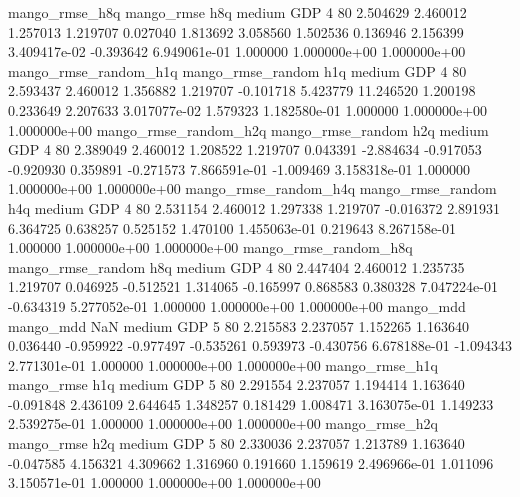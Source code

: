       mango_rmse_h8q        mango_rmse                  h8q     medium      GDP                 4 80  2.504629       2.460012 1.257013       1.219707    0.027040      1.813692      3.058560     1.502536       0.136946  2.156399 3.409417e-02    -0.393642   6.949061e-01            1.000000    1.000000e+00        1.000000e+00
mango_rmse_random_h1q mango_rmse_random                  h1q     medium      GDP                 4 80  2.593437       2.460012 1.356882       1.219707   -0.101718      5.423779     11.246520     1.200198       0.233649  2.207633 3.017077e-02     1.579323   1.182580e-01            1.000000    1.000000e+00        1.000000e+00
mango_rmse_random_h2q mango_rmse_random                  h2q     medium      GDP                 4 80  2.389049       2.460012 1.208522       1.219707    0.043391     -2.884634     -0.917053    -0.920930       0.359891 -0.271573 7.866591e-01    -1.009469   3.158318e-01            1.000000    1.000000e+00        1.000000e+00
mango_rmse_random_h4q mango_rmse_random                  h4q     medium      GDP                 4 80  2.531154       2.460012 1.297338       1.219707   -0.016372      2.891931      6.364725     0.638257       0.525152  1.470100 1.455063e-01     0.219643   8.267158e-01            1.000000    1.000000e+00        1.000000e+00
mango_rmse_random_h8q mango_rmse_random                  h8q     medium      GDP                 4 80  2.447404       2.460012 1.235735       1.219707    0.046925     -0.512521      1.314065    -0.165997       0.868583  0.380328 7.047224e-01    -0.634319   5.277052e-01            1.000000    1.000000e+00        1.000000e+00
            mango_mdd         mango_mdd                  NaN     medium      GDP                 5 80  2.215583       2.237057 1.152265       1.163640    0.036440     -0.959922     -0.977497    -0.535261       0.593973 -0.430756 6.678188e-01    -1.094343   2.771301e-01            1.000000    1.000000e+00        1.000000e+00
       mango_rmse_h1q        mango_rmse                  h1q     medium      GDP                 5 80  2.291554       2.237057 1.194414       1.163640   -0.091848      2.436109      2.644645     1.348257       0.181429  1.008471 3.163075e-01     1.149233   2.539275e-01            1.000000    1.000000e+00        1.000000e+00
       mango_rmse_h2q        mango_rmse                  h2q     medium      GDP                 5 80  2.330036       2.237057 1.213789       1.163640   -0.047585      4.156321      4.309662     1.316960       0.191660  1.159619 2.496966e-01     1.011096   3.150571e-01            1.000000    1.000000e+00        1.000000e+00

